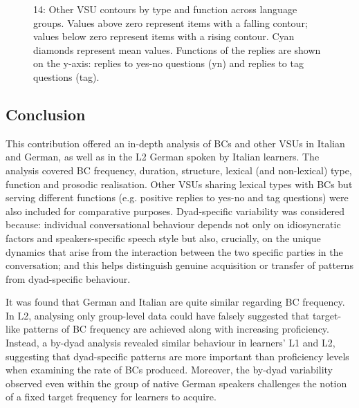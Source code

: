 \begin{stylecaption}
  
 
\end{stylecaption}

\begin{stylecaption}\begin{figure}
\caption{14: Other VSU contours by type and function across language groups. Values above zero represent items with a falling contour; values below zero represent items with a rising contour. Cyan diamonds represent mean values. Functions of the replies are shown on the y-axis: replies to yes-no questions (yn) and replies to tag questions (tag).}
\label{fig:key:4}
\end{figure}\end{stylecaption}

\subsection{Conclusion}
\hypertarget{Toc191305959}{}
This contribution offered an in-depth analysis of BCs and other VSUs in Italian and German, as well as in the L2 German spoken by Italian learners. The analysis covered BC frequency, duration, structure, lexical (and non-lexical) type, function and prosodic realisation. Other VSUs sharing lexical types with BCs but serving different functions (e.g. positive replies to yes-no and tag questions) were also included for comparative purposes. Dyad-specific variability was considered because:  individual conversational behaviour depends not only on idiosyncratic factors and speakers-specific speech style but also, crucially, on the unique dynamics that arise from the interaction between the two specific parties in the conversation; and  this helps distinguish genuine acquisition or transfer of patterns from dyad-specific behaviour.

It was found that German and Italian are quite similar regarding BC frequency. In L2, analysing only group-level data could have falsely suggested that target-like patterns of BC frequency are achieved along with increasing proficiency. Instead, a by-dyad analysis revealed similar behaviour in learners’ L1 and L2, suggesting that dyad-specific patterns are more important than proficiency levels when examining the rate of BCs produced. Moreover, the by-dyad variability observed even within the group of native German speakers challenges the notion of a fixed target frequency for learners to acquire.


